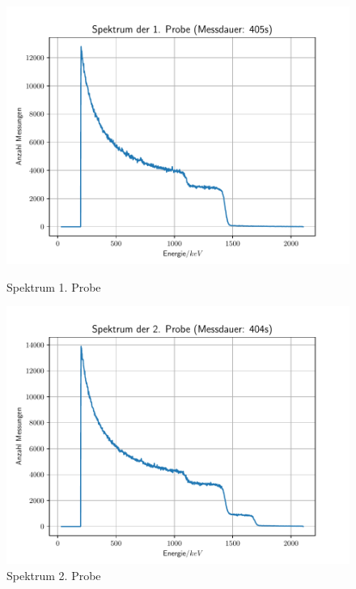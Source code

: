\begin{figure}[htbp] 
	\begin{minipage}[t]{0.45\linewidth} 
     \includegraphics[scale=0.5]{1Probe.pdf}
  \caption{Spektrum 1. Probe}
  \label{Probe11}
\end{minipage}
\hfill
\begin{minipage}[t]{0.45\linewidth}  
     \includegraphics[scale=0.5]{2Probe.pdf}
  \caption{Spektrum 2. Probe}
  \label{Probe21}
\end{minipage}
\end{figure}

